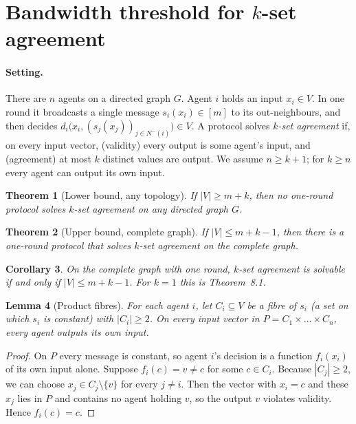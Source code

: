 \documentclass[11pt]{article}
\newtheorem{theorem}{Theorem}
\newtheorem{lemma}[theorem]{Lemma}
\newtheorem{corollary}[theorem]{Corollary}
\begin{document}
\section{Bandwidth threshold for $k$-set agreement}

\paragraph{Setting.} There are $n$ agents on a directed graph $G$. Agent $i$ holds an input $x_i\in V$. In one round it broadcasts a single message $s_i(x_i)\in[m]$ to its out-neighbours, and then decides $d_i\bigl(x_i,(s_j(x_j))_{j\in N^-(i)}\bigr)\in V$. A protocol solves \emph{$k$-set agreement} if, on every input vector, (validity) every output is some agent's input, and (agreement) at most $k$ distinct values are output. We assume $n\ge k+1$; for $k\ge n$ every agent can output its own input.

\begin{theorem}[Lower bound, any topology]\label{thm:kset-lower}
If $|V|\ge m+k$, then no one-round protocol solves $k$-set agreement on any directed graph $G$.
\end{theorem}

\begin{theorem}[Upper bound, complete graph]\label{thm:kset-upper}
If $|V|\le m+k-1$, then there is a one-round protocol that solves $k$-set agreement on the complete graph.
\end{theorem}

\begin{corollary}\label{cor:kset-exact}
On the complete graph with one round, $k$-set agreement is solvable if and only if $|V|\le m+k-1$. For $k=1$ this is Theorem~8.1.
\end{corollary}

\begin{lemma}[Product fibres]\label{lem:product}
For each agent $i$, let $C_i\subseteq V$ be a fibre of $s_i$ (a set on which $s_i$ is constant) with $|C_i|\ge 2$. On every input vector in $P=C_1\times\dots\times C_n$, every agent outputs its own input.
\end{lemma}

\begin{proof}
On $P$ every message is constant, so agent $i$'s decision is a function $f_i(x_i)$ of its own input alone. Suppose $f_i(c)=v\ne c$ for some $c\in C_i$. Because $|C_j|\ge 2$, we can choose $x_j\in C_j\setminus\{v\}$ for every $j\ne i$. Then the vector with $x_i=c$ and these $x_j$ lies in $P$ and contains no agent holding $v$, so the output $v$ violates validity. Hence $f_i(c)=c$.
\end{proof}
\end{document}
